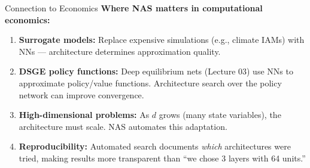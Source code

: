 \documentclass[aspectratio=169,11pt]{beamer}
\newcommand{\emphc}[1]{\textcolor{harvardcrimson}{#1}}
\begin{document}
\begin{frame}{Connection to Economics}
\textbf{Where NAS matters in computational economics:}

\vspace{0.3cm}
\begin{enumerate}
    \item \textbf{Surrogate models:} Replace expensive simulations (e.g., climate IAMs) with NNs --- architecture determines approximation quality.

    \vspace{0.2cm}
    \item \textbf{DSGE policy functions:} Deep equilibrium nets (Lecture 03) use NNs to approximate policy/value functions. \emphc{Architecture search over the policy network} can improve convergence.

    \vspace{0.2cm}
    \item \textbf{High-dimensional problems:} As $d$ grows (many state variables), the architecture must scale. NAS automates this adaptation.

    \vspace{0.2cm}
    \item \textbf{Reproducibility:} Automated search documents \emph{which} architectures were tried, making results more transparent than ``we chose 3 layers with 64 units.''
\end{enumerate}
\end{frame}
\end{document}
